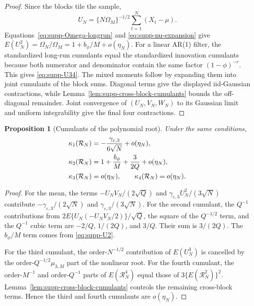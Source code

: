 \documentclass[12pt]{article}
\newtheorem{Proposition}{Proposition}[section]
\theoremstyle{remark}
\begin{document}
\begin{proof}
Since the blocks tile the sample,
\[
U_N=\{N\Omega_M\}^{-1/2}\sum_{t=1}^N(X_t-\mu).
\]
Equations~\eqref{eq:supp-Omega-longrun} and \eqref{eq:supp-nu-expansion} give
$E(U_N^2)=\Omega_N/\Omega_M=1+b_\phi/M+o(\eta_N)$.
For a linear AR(1) filter, the standardized long-run cumulants equal the standardized innovation cumulants because both numerator and denominator contain the same factor $(1-\phi)^{-r}$. This gives \eqref{eq:supp-U34}. The mixed moments follow by expanding them into joint cumulants of the block sums. Diagonal terms give the displayed iid-Gaussian contractions, while Lemma~\ref{lem:supp-cross-block-cumulants} bounds the off-diagonal remainder. Joint convergence of $(U_N,V_N,W_N)$ to its Gaussian limit and uniform integrability give the final four contractions.
\end{proof}

\begin{Proposition}[Cumulants of the polynomial root]
\label{prop:supp-leading-cumulants-ar1}
Under the same conditions,
\begin{align}
\kappa_1(\mathcal R_N)
&=
-\frac{\gamma_{\varepsilon,3}}{6\sqrt N}+o(\eta_N),
\notag\\
\kappa_2(\mathcal R_N)
&=
1+\frac{b_\phi}{M}+\frac{3}{2Q}+o(\eta_N),
\label{eq:supp-leading-root-cumulants}\\
\kappa_3(\mathcal R_N)
&=o(\eta_N),
\qquad
\kappa_4(\mathcal R_N)=o(\eta_N).
\notag
\end{align}
\end{Proposition}

\begin{proof}
For the mean, the terms $-U_NV_N/(2\sqrt Q)$ and
$\gamma_{\varepsilon,3}U_N^2/(3\sqrt N)$ contribute
$-\gamma_{\varepsilon,3}/(2\sqrt N)$ and
$\gamma_{\varepsilon,3}/(3\sqrt N)$.
For the second cumulant, the $Q^{-1}$ contributions from
$2E\{U_N(-U_NV_N/2)\}/\sqrt Q$,
the square of the $Q^{-1/2}$ term, and the $Q^{-1}$ cubic term are
$-2/Q$, $1/(2Q)$, and $3/Q$. Their sum is $3/(2Q)$. The $b_\phi/M$ term comes from \eqref{eq:supp-U2}.

For the third cumulant, the order-$N^{-1/2}$ contribution of $E(U_N^3)$ is cancelled by the order-$Q^{-1/2}\mu_{3,M}$ part of the nonlinear root. For the fourth cumulant, the order-$M^{-1}$ and order-$Q^{-1}$ parts of $E(\mathcal R_N^4)$ equal those of $3\{E(\mathcal R_N^2)\}^2$. Lemma~\ref{lem:supp-cross-block-cumulants} controls the remaining cross-block terms. Hence the third and fourth cumulants are $o(\eta_N)$.
\end{proof}
\end{document}
